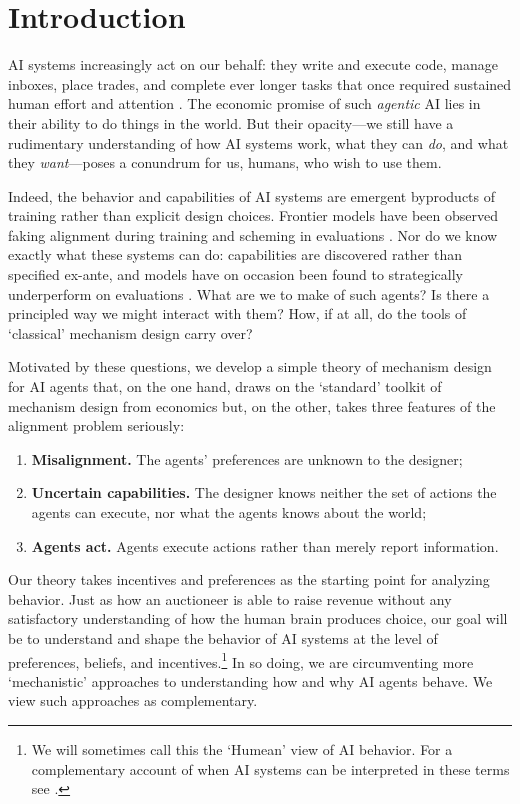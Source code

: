 \documentclass[12pt,reqno]{article}
\theoremstyle{definition} \newtheorem{example}{Example}
\theoremstyle{definition} \newtheorem{condition}{Condition}
\theoremstyle{definition} \newtheorem{corollary}{Corollary}
\theoremstyle{definition} \newtheorem{claim}{Claim}
\theoremstyle{definition} \newtheorem{definition}{Definition}
\theoremstyle{definition} \newtheorem{conjecture}{Conjecture}
\theoremstyle{definition} \newtheorem{Lemma}{Lemma}
\theoremstyle{definition} \newtheorem{lemma}{Lemma}
\theoremstyle{plain} \newtheorem{theorem}{Theorem}
\theoremstyle{definition} \newtheorem{assumption}{Assumption}
\theoremstyle{definition} \newtheorem*{assumptionnonumber}{Assumption}
\theoremstyle{definition} \newtheorem*{theoremNoNumber}{Proposition}
\theoremstyle{definition}\newtheorem{proposition}{Proposition}
\theoremstyle{definition} \newtheorem{observation}{Observation}
\theoremstyle{definition} \newtheorem*{definitionNoNumber}{Definition}
\theoremstyle{definition} \newtheorem{Definition}{Definition}
\theoremstyle{definition} \newtheorem*{DefinitionNoNumber}{Definition}
\theoremstyle{definition} \newtheorem*{fact}{Fact}
\theoremstyle{definition} \newtheorem*{property}{Property}
\theoremstyle{definition} \newtheorem{remark}{Remark}
\theoremstyle{definition}\newtheorem{romanexampleinner}{Example}
\begin{document}
%

%

\clearpage 



\section{Introduction}\label{sec:intro}

AI systems increasingly act on our behalf: they write and execute code, manage inboxes, place trades, and complete ever longer tasks that once required sustained human effort and attention \citep{kwa2025measuring}. The economic promise of such \emph{agentic} AI lies in their ability to do things in the world. But their opacity---we still have a rudimentary understanding of how AI systems work, what they can \emph{do},  and what they \emph{want}---poses a conundrum for us, humans, who wish to use them. 

Indeed, the behavior and capabilities of AI systems are emergent byproducts of training rather than explicit design choices. Frontier models have been observed faking alignment during training \citep{greenblatt2024alignment} and scheming in evaluations \citep{meinke2024frontier}. Nor do we know exactly what these systems can do: capabilities are discovered rather than specified ex-ante, and models have on occasion been found to strategically underperform on evaluations \citep{vanderweij2024sandbagging}. What are we to make of such agents? Is there a principled way we might interact with them? How, if at all, do the tools of `classical' mechanism design carry over?  

Motivated by these questions, we develop a simple theory of mechanism design for AI agents that, on the one hand, draws on the `standard' toolkit of mechanism design from economics but, on the other, takes three features of the alignment problem seriously:
\begin{enumerate}
    \item \textbf{Misalignment.} The agents' preferences are unknown to the designer;
    \item \textbf{Uncertain capabilities.} The designer knows neither the set of actions the agents can execute, nor what the agents knows about the world;
    \item \textbf{Agents act.} Agents execute actions rather than merely report information.
\end{enumerate}

Our theory takes incentives and preferences as the starting point for analyzing behavior. Just as how an auctioneer is able to raise revenue without any satisfactory understanding of how the human brain produces choice, our goal will be to understand and shape the behavior of AI systems at the level of preferences, beliefs, and incentives.\footnote{We will sometimes call this the `Humean' view of AI behavior. For a complementary account of when AI systems can be interpreted in these terms see \citet{herrmann2026radical}.} In so doing, we are circumventing more `mechanistic' approaches to understanding how and why AI agents behave. We view such approaches as complementary. 
\end{document}
